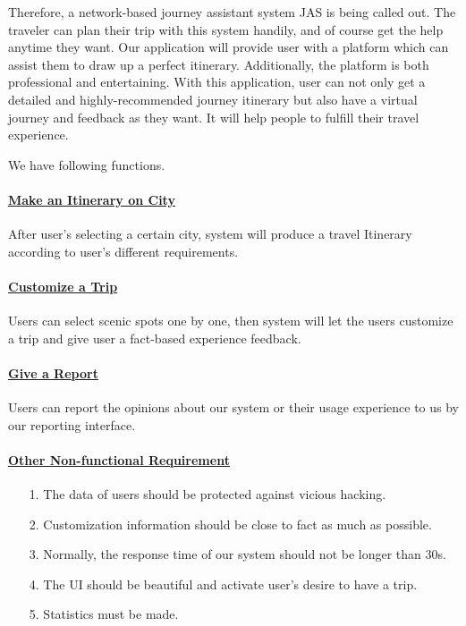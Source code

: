 \documentclass[10pt]{article}
\begin{document}
Therefore, a network-based journey assistant system JAS is being called out. The traveler can plan their trip with this system handily, and of course get the help anytime they want. Our application will provide user with a platform which can assist them to draw up a perfect itinerary. Additionally, the platform is both professional and entertaining. With this application, user can not only get a detailed and highly-recommended journey itinerary but also have a virtual journey and feedback as they want. It will help people to fulfill their travel experience. 

We have following functions. 

\paragraph{\underline{Make an Itinerary on City}} After user’s selecting a certain city, system will produce a travel Itinerary according to user’s different requirements.

\paragraph{\underline{Customize a Trip}} Users can select scenic spots one by one, then system will let the users customize a trip and give user a fact-based experience feedback.

\paragraph{\underline{Give a Report}} Users can report the opinions about our system or their usage experience to us by our reporting interface.

\paragraph{\underline{Other Non-functional Requirement}}
\begin{itemize}
	\item[1.] The data of users should be protected against vicious hacking.
	\item[2.]	Customization information should be close to fact as much as possible.
	\item[3.]	Normally, the response time of our system should not be longer than 30s.
	\item[4.]	The UI should be beautiful and activate user’s desire to have a trip.
	\item[5.]	Statistics must be made.
	
\end{itemize}
\end{document}
